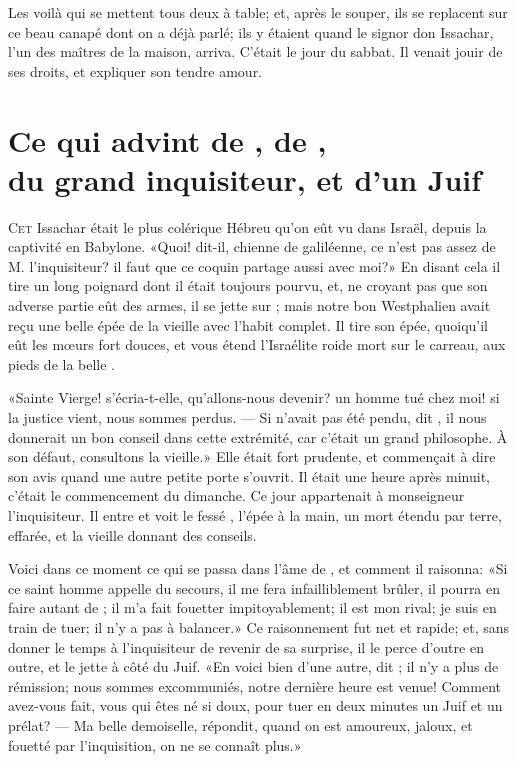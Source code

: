 Les voilà qui se mettent tous deux à table; et, après le souper, ils se
replacent sur ce beau canapé dont on a déjà parlé; ils y étaient quand
le signor don Issachar, l’un des maîtres de la maison, arriva. C’était
le jour du sabbat. Il venait jouir de ses droits, et expliquer son
tendre amour.





\chapter[Ce qui advint de Cunégonde, de Candide…]{Ce qui advint de , de ,\\du grand inquisiteur, et d’un
Juif}


\lettrine{C}{et} Issachar était le plus colérique Hébreu qu’on eût vu dans Israël,
depuis la captivité en Babylone. «Quoi! dit-il, chienne de galiléenne,
ce n’est pas assez de M. l’inquisiteur? il faut que ce coquin
partage aussi avec moi?» En disant cela il tire un long poignard dont il
était toujours pourvu, et, ne croyant pas que son adverse partie eût
des armes, il se jette sur ; mais notre bon Westphalien avait
reçu une belle épée de la vieille avec l’habit complet. Il tire son
épée, quoiqu’il eût les mœurs fort douces, et vous étend l’Israélite
roide mort sur le carreau, aux pieds de la belle .

«Sainte Vierge! s’écria-t-elle, qu’allons-nous devenir? un homme tué
chez moi! si la justice vient, nous sommes perdus. — Si  n’avait
pas été pendu, dit , il nous donnerait un bon conseil dans cette
extrémité, car c’était un grand philosophe. À son défaut, consultons la
vieille.» Elle était fort prudente, et commençait à dire son avis quand
une autre petite porte s’ouvrit. Il était une heure après minuit,
c’était le commencement du dimanche. Ce jour appartenait à monseigneur
l’inquisiteur. Il entre et voit le fessé , l’épée à la main, un
mort étendu par terre,  effarée, et la vieille donnant des
conseils.

Voici dans ce moment ce qui se passa dans l’âme de , et comment
il raisonna: «Si ce saint homme appelle du secours, il me fera
infailliblement brûler, il pourra en faire autant de ; il m’a
fait fouetter impitoyablement; il est mon rival; je suis en train de
tuer; il n’y a pas à balancer.» Ce raisonnement fut net et rapide; et,
sans donner le temps à l’inquisiteur de revenir de sa surprise, il le
perce d’outre en outre, et le jette à côté du Juif. «En voici bien d’une
autre, dit ; il n’y a plus de rémission; nous sommes
excommuniés, notre dernière heure est venue! Comment avez-vous fait,
vous qui êtes né si doux, pour tuer en deux minutes un Juif et un
prélat? — Ma belle demoiselle, répondit, quand on est amoureux,
jaloux, et fouetté par l’inquisition, on ne se connaît plus.»

